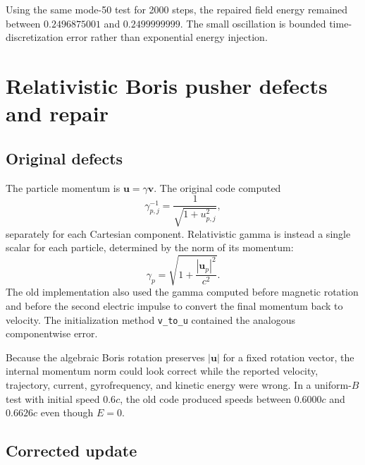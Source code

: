 \documentclass[11pt,a4paper]{article}
\newcommand{\code}[1]{\texttt{#1}}
\begin{document}
Using the same mode-50 test for 2000 steps, the repaired field energy remained
between $0.2496875001$ and $0.2499999999$.  The small oscillation is bounded
time-discretization error rather than exponential energy injection.

\section{Relativistic Boris pusher defects and repair}

\subsection{Original defects}

The particle momentum is $\mathbf{u}=\gamma\mathbf{v}$.  The original code
computed
\begin{equation}
  \gamma^{-1}_{p,j}=\frac{1}{\sqrt{1+u_{p,j}^2}},
\end{equation}
separately for each Cartesian component.  Relativistic gamma is instead a
single scalar for each particle, determined by the norm of its momentum:
\begin{equation}
  \gamma_p=\sqrt{1+\frac{|\mathbf{u}_p|^2}{c^2}}.
\end{equation}
The old implementation also used the gamma computed before magnetic rotation
and before the second electric impulse to convert the final momentum back to
velocity.  The initialization method \code{v\_to\_u} contained the analogous
componentwise error.

Because the algebraic Boris rotation preserves $|\mathbf{u}|$ for a fixed
rotation vector, the internal momentum norm could look correct while the
reported velocity, trajectory, current, gyrofrequency, and kinetic energy were
wrong.  In a uniform-$B$ test with initial speed $0.6c$, the old code produced
speeds between $0.6000c$ and $0.6626c$ even though $E=0$.

\subsection{Corrected update}
\end{document}
